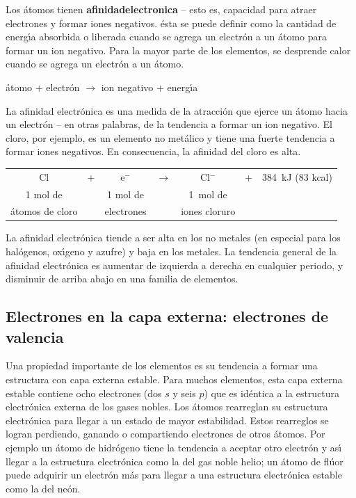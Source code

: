 Los \'atomos tienen \textbf{\gls{afinidadelectronica}} -- esto es, capacidad para atraer electrones y formar iones negativos. \'esta se puede definir como la cantidad de energ\'{\i}a absorbida o liberada cuando se agrega un electr\'on a un \'atomo para formar un ion negativo. Para la mayor parte de los elementos, se desprende calor cuando se agrega un electr\'on a un \'atomo.
\begin{center}
\'atomo + electr\'on $\longrightarrow$ ion negativo + energ\'{\i}a
\end{center}

La afinidad electr\'onica es una medida de la atracci\'on que ejerce un \'atomo  hacia un electr\'on -- en otras palabras, de la tendencia a formar un ion
negativo. El cloro, por ejemplo, es un elemento no met\'alico y tiene una fuerte tendencia a formar iones negativos. En consecuencia, la afinidad del cloro es alta.
\begin{center}
    \begin{tabular}{ccccccc}
        Cl &+& e$^-$ & $\longrightarrow$& Cl$^-$ & + &\SI{384}{\kilo\joule}  (83 kcal)\\
        {\scriptsize 1 mol de}&&{\scriptsize 1 mol de}&&{\scriptsize \SI{1}{\mole} de}\\[-.1in]
        {\scriptsize \'atomos de cloro}&&{\scriptsize electrones}&&{\scriptsize iones
        cloruro}\\
    \end{tabular}
\end{center}

La afinidad electr\'onica tiende a ser alta en los no metales (en especial para los hal\'ogenos, ox\'{\i}geno y azufre) y baja en los metales. La tendencia general de la afinidad electr\'onica es aumentar de izquierda a derecha en cualquier periodo, y disminuir de arriba abajo en una familia de elementos.

\subsection[Electrones de valencia]{Electrones en la capa externa: electrones de
valencia}

Una propiedad importante de los elementos es su tendencia a formar una estructura con capa externa estable. Para muchos elementos, esta capa externa estable contiene ocho electrones (dos $s$ y seis $p$) que es id\'entica a la estructura electr\'onica externa de los gases nobles. Los \'atomos rearreglan su estructura electr\'onica para llegar a un estado de mayor estabilidad. Estos rearreglos se logran perdiendo, ganando o compartiendo electrones de otros \'atomos. Por ejemplo un \'atomo de hidr\'ogeno tiene la tendencia a aceptar otro electr\'on y as\'{\i} llegar a la estructura electr\'onica como la del gas noble helio; un \'atomo de fl\'uor puede adquirir un electr\'on m\'as para llegar a una estructura electr\'onica estable como la del ne\'on.

